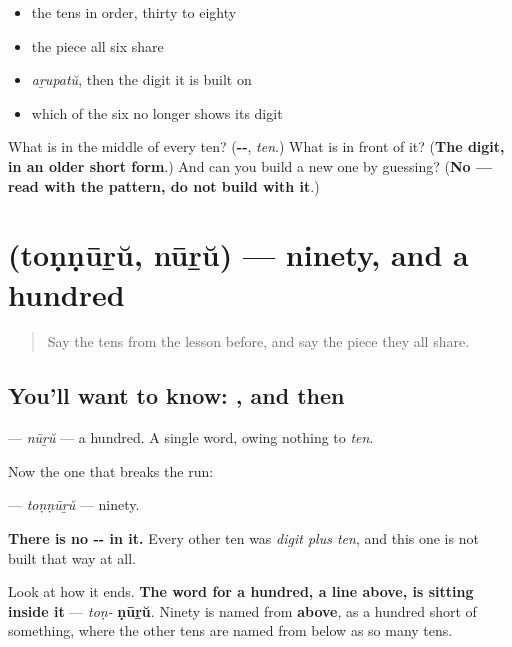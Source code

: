 \begin{itemize}
\raggedright
  \item the tens in order, thirty to eighty
  \item the piece all six share
  \item \emph{aṟupatŭ}, then the digit it is built on
  \item which of the six no longer shows its digit
\end{itemize}

\begin{tcolorbox}[breakable,colback=teal!4,colframe=teal!35!black,title={Before you move on}]
What is in the middle of every ten? (\textbf{--}, \emph{ten}.) What is in front of it? (\textbf{The digit, in an older short form}.) And can you build a new one by guessing? (\textbf{No — read with the pattern, do not build with it}.)
\end{tcolorbox}
\section[\texorpdfstring{\ml{തൊണ്ണൂറ്} \ml{നൂറ്} (toṇṇūṟŭ nūṟŭ)}{തൊണ്ണൂറ് നൂറ് (toṇṇūṟŭ nūṟŭ)}]{  (toṇṇūṟŭ, nūṟŭ) — ninety, and a hundred}

\label{lesson:ML-C88-ninety-hundred}



\begin{quote}
Say the tens from the lesson before, and say the piece they all share.
\end{quote}

\subsection*{You'll want to know: , and then }
\textbf{} — \emph{nūṟŭ} — a hundred. A single word, owing nothing to \emph{ten}.

Now the one that breaks the run:

\textbf{} — \emph{toṇṇūṟŭ} — ninety.

\textbf{There is no -- in it.} Every other ten was \emph{digit plus ten}, and this one is not built that way at all.

Look at how it ends. \textbf{The word for a hundred, a line above, is sitting inside it} — \emph{toṇ-} \textbf{ṇūṟŭ}. Ninety is named from \textbf{above}, as a hundred short of something, where the other tens are named from below as so many tens.

